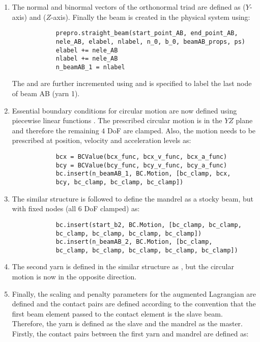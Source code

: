 \begin{enumerate}
    \item The normal and binormal vectors of the orthonormal triad are defined as  ($Y$-axis) and  ($Z$-axis). Finally the beam is created in the physical system using:
        \pythonstyle
        \begin{lstlisting}
            prepro.straight_beam(start_point_AB, end_point_AB, 
            nele_AB, elabel, nlabel, n_0, b_0, beamAB_props, ps)
            elabel += nele_AB 
            nlabel += nele_AB 
            n_beamAB_1 = nlabel
        \end{lstlisting}
        The  and  are further incremented using  and  is specified to label the last node of beam AB (yarn 1).
    \item Essential boundary conditions for circular motion are now defined using piecewise linear functions . The prescribed circular motion is in the $YZ$ plane and therefore the remaining $4$ DoF are clamped. Also, the motion needs to be prescribed at position, velocity and acceleration levels as:
        \pythonstyle
        \begin{lstlisting}
            bcx = BCValue(bcx_func, bcx_v_func, bcx_a_func)
            bcy = BCValue(bcy_func, bcy_v_func, bcy_a_func)
            bc.insert(n_beamAB_1, BC.Motion, [bc_clamp, bcx, 
            bcy, bc_clamp, bc_clamp, bc_clamp])
        \end{lstlisting}
    \item The similar structure is followed to define the mandrel as a stocky beam, but with fixed nodes (all $6$ DoF clamped) as:
        \pythonstyle
        \begin{lstlisting}
            bc.insert(start_b2, BC.Motion, [bc_clamp, bc_clamp, 
            bc_clamp, bc_clamp, bc_clamp, bc_clamp])
            bc.insert(n_beamAB_2, BC.Motion, [bc_clamp, 
            bc_clamp, bc_clamp, bc_clamp, bc_clamp, bc_clamp])
        \end{lstlisting}
    \item The second yarn is defined in the similar structure as , but the circular motion is now in the opposite direction.
    \item Finally, the scaling and penalty parameters for the augmented Lagrangian are defined and the contact pairs are defined according to the convention that the first beam element passed to the contact element is the slave beam. Therefore, the yarn is defined as the slave and the mandrel as the master. Firstly, the contact pairs between the first yarn  and mandrel  are defined as:

\end{enumerate}
